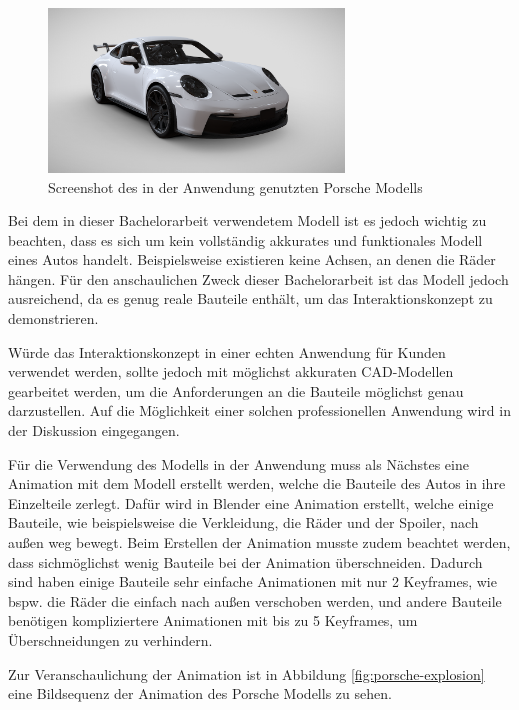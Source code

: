 \begin{figure}[H]
    \centering
    \includegraphics[width=0.7\textwidth]{images/PorscheModell.png}
    \caption{Screenshot des in der Anwendung genutzten Porsche Modells}
    \label{fig:porsche}
\end{figure}

Bei dem in dieser Bachelorarbeit verwendetem Modell ist es jedoch wichtig zu beachten, dass es sich um kein vollständig akkurates und funktionales Modell eines Autos handelt.
Beispielsweise existieren keine Achsen, an denen die Räder hängen.
Für den anschaulichen Zweck dieser Bachelorarbeit ist das Modell jedoch ausreichend, da es genug \glqq{}reale\grqq{}  Bauteile enthält, um das Interaktionskonzept zu demonstrieren.

Würde das Interaktionskonzept in einer echten Anwendung für Kunden verwendet werden, sollte jedoch mit möglichst akkuraten CAD-Modellen gearbeitet werden, um die Anforderungen an die Bauteile möglichst genau darzustellen.
Auf die Möglichkeit einer solchen professionellen Anwendung wird in der Diskussion eingegangen.

Für die Verwendung des Modells in der Anwendung muss als Nächstes eine Animation mit dem Modell erstellt werden, welche die Bauteile des Autos in ihre Einzelteile zerlegt.
Dafür wird in Blender eine Animation erstellt, welche einige Bauteile, wie beispielsweise die Verkleidung, die Räder und der Spoiler, nach außen weg bewegt.
Beim Erstellen der Animation musste zudem beachtet werden, dass sichmöglichst wenig Bauteile bei der Animation überschneiden.
Dadurch sind haben einige Bauteile sehr einfache Animationen mit nur 2 Keyframes, wie bspw. die Räder die einfach nach außen verschoben werden, und andere Bauteile benötigen kompliziertere Animationen mit bis zu 5 Keyframes, um Überschneidungen zu verhindern.

Zur Veranschaulichung der Animation ist in Abbildung \ref{fig:porsche-explosion} eine Bildsequenz der Animation des Porsche Modells zu sehen.

